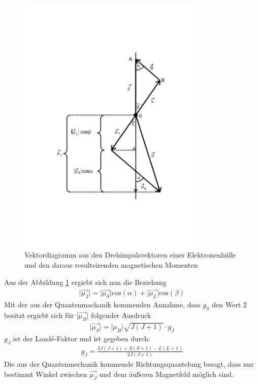 \begin{figure}[h!]
  \centering
  \includegraphics[width=0.8\textwidth]{606kopplung.pdf}
  \caption{Vektordiagramm aus den Drehimpulsvektoren einer Elektronenhülle und den daraus resulteirenden magnetischen Momenten \cite{1}}
  \label{fig:mMoment}
\end{figure}
Aus der Abbildung \ref{fig:mMoment} ergiebt sich nun die Beziehung
\begin{align*}
  \bigl|\vec{\mu_J}\bigr|=\bigl|\vec{\mu_S}\bigl|\text{cos}(\alpha)+\bigl|\vec{\mu_L}\bigr|\text{cos}(\beta)
\end{align*}
Mit der aus der Quantenmachanik kommenden Annahme, dass $g_S$ den Wert 2 besitzt ergiebt sich für $\bigl|\vec{\mu_B}\bigl|$ folgender Ausdruck
\begin{align*}
  \bigl|\vec{\mu_S}\bigr|=\bigl|\mu_B\bigr|\sqrt{J(J+1)}\cdot g_J
\end{align*}
$g_J$ ist der Landé-Faktor und ist gegeben durch:
\begin{align}
  g_J=\frac{3J(J+1)+S(S+1)-L(L+1)}{2J(J+1)}
  \label{eqn:lande}
\end{align}
Die aus der Quantenmechanik kommende Richtungsquantelung besagt, dass nur bestimmt Winkel zwischen $\vec{\mu_J}$ und dem äußeren Magnetfeld möglich sind.
